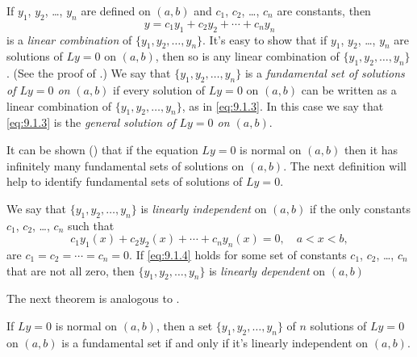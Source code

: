 If $y_1$, $y_2$, \dots, $y_n$ are defined on $(a,b)$ and
$c_1$, $c_2$, \dots, $c_n$ are constants, then
\begin{equation}\label{eq:9.1.3}
y=c_1y_1+c_2y_2+\cdots+c_ny_n
\end{equation}
is a \emph{\color{blue}linear combination} of $\{y_1,y_2,\dots,y_n\}$. It's
easy
 to show that if $y_1$, $y_2$, \dots, $y_n$ are solutions of
$Ly=0$ on $(a,b)$, then so is any linear combination of
$\{y_1,y_2,\dots,y_n\}$. (See the proof of .) We
say that $\{y_1,y_2,\dots,y_n\}$ is a \emph{\color{blue}fundamental set of
solutions of $Ly=0$ on}
$(a,b)$ if every solution of $Ly=0$ on
$(a,b)$ can be written as a linear combination of
$\{y_1,y_2,\dots,y_n\}$, as in \eqref{eq:9.1.3}. In this case we say that
\eqref{eq:9.1.3} is the \emph{\color{blue}general solution of $Ly=0$ on
$(a,b)$}.


It can be shown () that if the equation $Ly=0$
is normal on $(a,b)$ then it has infinitely many fundamental sets of
solutions
on $(a,b)$. The next definition will help to identify fundamental sets of
solutions of $Ly=0$.



We say that $\{y_1,y_2,\dots,y_n\}$ is \emph{\color{blue}linearly independent} on
$(a,b)$ if the only constants $c_1$, $c_2$, \dots, $c_n$ such that
\begin{equation}\label{eq:9.1.4}
c_1y_1(x)+c_2y_2(x)+\cdots+c_ny_n(x)=0,\quad a<x<b,
\end{equation}
are $c_1=c_2=\cdots=c_n=0$. If \eqref{eq:9.1.4} holds for some set of
constants $c_1$, $c_2$, \dots, $c_n$ that are not all zero, then
$\{y_1,y_2,\dots,y_n\}$ is \emph{\color{blue}linearly dependent} on $(a,b)$

The next theorem is analogous to
.

\begin{theorem}\label{thmtype:9.1.2}
If  $Ly=0$ is normal on $(a,b)$, then a set
$\{y_1,y_2,\dots,y_n\}$ of $n$ solutions of $Ly=0$ on $(a,b)$ is a
fundamental set if and only if it's linearly independent on $(a,b)$.
\end{theorem}


